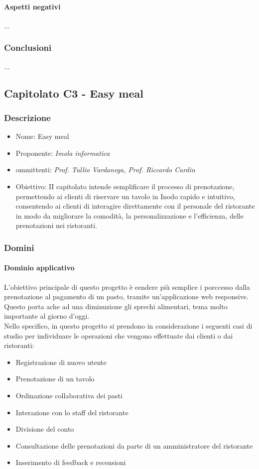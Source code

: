 \documentclass[italian,12pt]{article} %
\begin{document}
\paragraph{Aspetti negativi}
...

\subsubsection{Conclusioni}
...



\subsection{Capitolato C3 - Easy meal}

\subsubsection{Descrizione}
\begin{itemize}
	\item Nome: Easy meal
	\item Proponente: {\it Imola informatica}
	\item ommittenti: {\it Prof. Tullio Vardanega, Prof. Riccardo Cardin}
	\item Obiettivo: II capitolato intende semplificare il processo di prenotazione, permettendo ai clienti di riservare un tavolo in Inodo rapido e intuitivo, consentendo ai clienti di interagire direttamente con il personale del ristorante in modo da migliorare la comodità, la personalizzazione e l'efficienza, delle prenotazioni nei ristoranti.
\end{itemize}

\subsubsection{Domini}
\paragraph{Dominio applicativo}
L'obiettivo principale di questo progetto è eendere più semplice i porccesso dalla prenotazione al pagamento di un pasto, tramite un'applicazione web responsive. Questo porta ache ad una diminuzione gli sprechi alimentari, tema molto importante al giorno d'oggi. \\
Nello specifico, in questo progetto si prendono in considerazione i seguenti casi di studio per individuare le operazioni che vengono effettuate dai clienti o dai ristoranti:
\begin{itemize}
	\item Registrazione di nuovo utente
	\item Prenotazione di un tavolo
	\item Ordinazione collaborativa dei pasti
	\item Interazione con lo staff del ristorante
	\item Divisione del conto
	\item Consultazione delle prenotazioni da parte di un amministratore del ristorante
	\item Inserimento di feedback e recensioni
\end{itemize}
\end{document}
